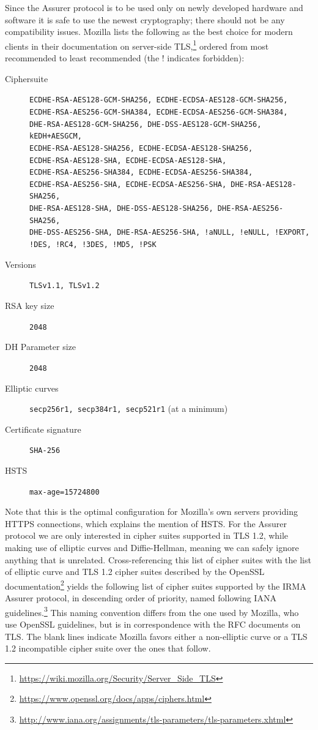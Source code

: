 Since the Assurer protocol is to be used only on newly developed hardware and software it is safe to use the newest cryptography; there should not be any compatibility issues. Mozilla lists the following as the best choice for modern clients in their documentation on server-side TLS,\footnote{\url{https://wiki.mozilla.org/Security/Server_Side_TLS}} ordered from most recommended to least recommended (the $!$ indicates forbidden):

\begin{description}
	\item [Ciphersuite] \texttt{ECDHE-RSA-AES128-GCM-SHA256, ECDHE-ECDSA-AES128-GCM-SHA256, \\
ECDHE-RSA-AES256-GCM-SHA384, ECDHE-ECDSA-AES256-GCM-SHA384, \\
DHE-RSA-AES128-GCM-SHA256, DHE-DSS-AES128-GCM-SHA256, kEDH+AESGCM, \\
ECDHE-RSA-AES128-SHA256, ECDHE-ECDSA-AES128-SHA256, \\
ECDHE-RSA-AES128-SHA, ECDHE-ECDSA-AES128-SHA, \\
ECDHE-RSA-AES256-SHA384, ECDHE-ECDSA-AES256-SHA384, \\
ECDHE-RSA-AES256-SHA, ECDHE-ECDSA-AES256-SHA, DHE-RSA-AES128-SHA256, \\
DHE-RSA-AES128-SHA, DHE-DSS-AES128-SHA256, DHE-RSA-AES256-SHA256, \\
DHE-DSS-AES256-SHA, DHE-RSA-AES256-SHA, !aNULL, !eNULL, !EXPORT, \\
!DES, !RC4, !3DES, !MD5, !PSK}
  \item [Versions] \texttt{TLSv1.1, TLSv1.2}
  \item [RSA key size] \texttt{2048}
  \item [DH Parameter size] \texttt{2048}
  \item [Elliptic curves] \texttt{secp256r1, secp384r1, secp521r1} (at a minimum)
  \item [Certificate signature] \texttt{SHA-256}
  \item [HSTS] \texttt{max-age=15724800}
\end{description}

Note that this is the optimal configuration for Mozilla's own servers providing HTTPS connections, which explains the mention of HSTS. For the Assurer protocol we are only interested in cipher suites supported in TLS 1.2, while making use of elliptic curves and Diffie-Hellman, meaning we can safely ignore anything that is unrelated. Cross-referencing this list of cipher suites with the list of elliptic curve and TLS 1.2 cipher suites described by the OpenSSL documentation\footnote{\url{https://www.openssl.org/docs/apps/ciphers.html}} yields the following list of cipher suites supported by the IRMA Assurer protocol, in descending order of priority, named following IANA guidelines.\footnote{\url{http://www.iana.org/assignments/tls-parameters/tls-parameters.xhtml}} This naming convention differs from the one used by Mozilla, who use OpenSSL guidelines, but is in correspondence with the RFC documents on TLS. The blank lines indicate Mozilla favors either a non-elliptic curve or a TLS 1.2 incompatible cipher suite over the ones that follow. 

